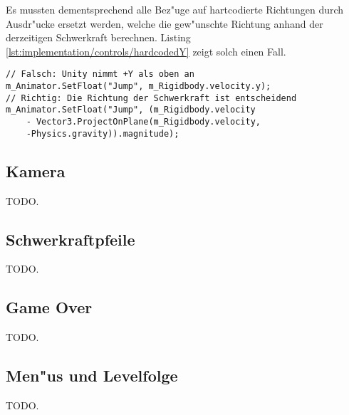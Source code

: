 Es mussten dementsprechend alle Bez"uge auf hartcodierte
Richtungen durch Ausdr"ucke ersetzt werden, welche die
gew"unschte Richtung anhand der derzeitigen Schwerkraft
berechnen. Listing
\ref{lst:implementation/controls/hardcodedY} zeigt solch
einen Fall.

\begin{lstlisting}[caption={Korrektur hartcodierter Richtungen},label=lst:implementation/controls/hardcodedY]
// Falsch: Unity nimmt +Y als oben an
m_Animator.SetFloat("Jump", m_Rigidbody.velocity.y);
// Richtig: Die Richtung der Schwerkraft ist entscheidend
m_Animator.SetFloat("Jump", (m_Rigidbody.velocity
    - Vector3.ProjectOnPlane(m_Rigidbody.velocity,
    -Physics.gravity)).magnitude);
\end{lstlisting}
%
\subsection{Kamera}
\label{sec:implementation/camera}
%
TODO.
%
\subsection{Schwerkraftpfeile}
\label{sec:implementation/arrows}
%
TODO.
%
\subsection{Game Over}
\label{sec:implementation/gameover}
%
TODO.
%
\subsection{Men"us und Levelfolge}
\label{sec:implementation/menus}
%
TODO.
